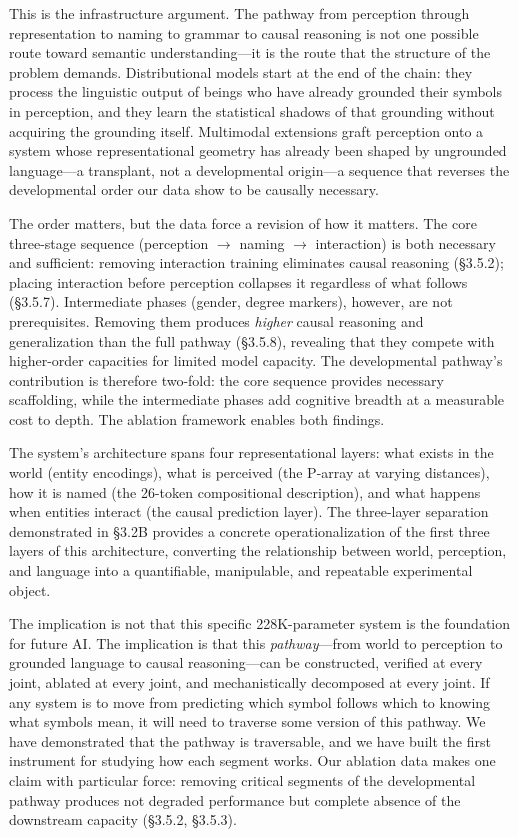\documentclass{article}
\begin{document}
This is the infrastructure argument. The pathway from perception through representation to naming to grammar to causal reasoning is not one possible route toward semantic understanding---it is the route that the structure of the problem demands. Distributional models start at the end of the chain: they process the linguistic output of beings who have already grounded their symbols in perception, and they learn the statistical shadows of that grounding without acquiring the grounding itself. Multimodal extensions graft perception onto a system whose representational geometry has already been shaped by ungrounded language---a transplant, not a developmental origin---a sequence that reverses the developmental order our data show to be causally necessary.

The order matters, but the data force a revision of how it matters. The core three-stage sequence (perception $\rightarrow$ naming $\rightarrow$ interaction) is both necessary and sufficient: removing interaction training eliminates causal reasoning (\S3.5.2); placing interaction before perception collapses it regardless of what follows (\S3.5.7). Intermediate phases (gender, degree markers), however, are not prerequisites. Removing them produces \emph{higher} causal reasoning and generalization than the full pathway (\S3.5.8), revealing that they compete with higher-order capacities for limited model capacity. The developmental pathway's contribution is therefore two-fold: the core sequence provides necessary scaffolding, while the intermediate phases add cognitive breadth at a measurable cost to depth. The ablation framework enables both findings.

The system's architecture spans four representational layers: what exists in the world (entity encodings), what is perceived (the P-array at varying distances), how it is named (the 26-token compositional description), and what happens when entities interact (the causal prediction layer). The three-layer separation demonstrated in \S3.2B provides a concrete operationalization of the first three layers of this architecture, converting the relationship between world, perception, and language into a quantifiable, manipulable, and repeatable experimental object.

The implication is not that this specific 228K-parameter system is the foundation for future AI. The implication is that this \emph{pathway}---from world to perception to grounded language to causal reasoning---can be constructed, verified at every joint, ablated at every joint, and mechanistically decomposed at every joint. If any system is to move from predicting which symbol follows which to knowing what symbols mean, it will need to traverse some version of this pathway. We have demonstrated that the pathway is traversable, and we have built the first instrument for studying how each segment works. Our ablation data makes one claim with particular force: removing critical segments of the developmental pathway produces not degraded performance but complete absence of the downstream capacity (\S3.5.2, \S3.5.3).
\end{document}
